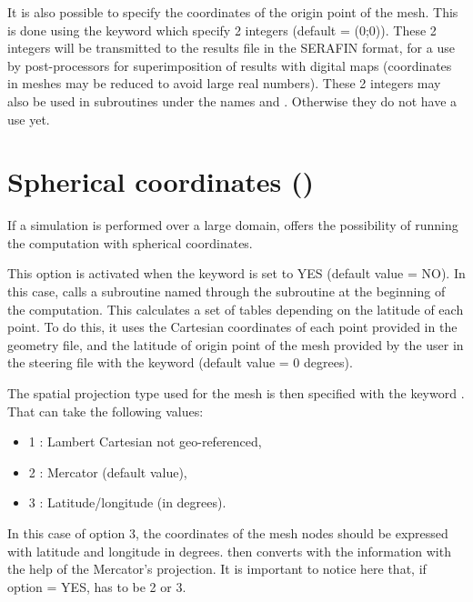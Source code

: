 It is also possible to specify the coordinates of the origin point of the mesh.
This is done using the keyword 
which specify 2 integers (default = (0;0)).
These 2 integers will be transmitted to the results file in the SERAFIN format,
for a use by post-processors for superimposition of results with digital maps
(coordinates in meshes may be reduced to avoid large real numbers).
These 2 integers may also be used in subroutines under the names
 and .
Otherwise they do not have a use yet.


\section{Spherical coordinates ()}
\label{sec:spher:coord:LATI}
If a simulation is performed over a large domain,  offers
the possibility of running the computation with spherical coordinates.

This option is activated when the keyword 
is set to YES (default value = NO).
In this case,  calls a subroutine named 
through the subroutine  at the beginning of the computation.
This calculates a set of tables depending on the latitude of each point.
To do this, it uses the Cartesian coordinates of each point provided
in the geometry file, and the latitude of origin point of the mesh
provided by the user in the steering file with the keyword
 (default value = 0 degrees).

The spatial projection type used for the mesh is then specified with the
keyword . That can take the following values:
\begin{itemize}
\item 1 : Lambert Cartesian not geo-referenced,

\item 2 : Mercator (default value),

\item 3 : Latitude/longitude (in degrees).
\end{itemize}

In this case of option 3, the coordinates of the mesh nodes should be
expressed with latitude and longitude in degrees.  then converts with
the information with the help of the Mercator's projection.
It is important to notice here that, if option 
= YES,  has to be 2 or 3.

